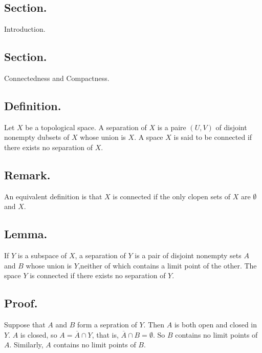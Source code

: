 \documentclass[titlepage]{article}
\begin{document}
\maketitle

\tableofcontents

\newpage {}

\subsection{Section.} Introduction.

\newpage {}

\subsection{Section.} Connectedness and Compactness.

\subsection{Definition.} Let $X$ be a topological space. A separation of $X$ is a paire $(U, V)$ of disjoint nonempty dubsets of $X$ whose union is $X$. A space $X$ is said to be connected if there exists no separation of $X$.

\subsection{Remark.} An equivalent definition is that $X$ is connected if the only clopen sets of $X$ are $\emptyset$ and $X$.

\subsection{Lemma.} If $Y$ is a subspace of $X$, a separation of $Y$ is a pair of disjoint nonempty sets $A$ and $B$ whose union is $Y$,neither of which contains a limit point of the other. The space $Y$ is connected if there exists no separation of $Y$.

\subsection{Proof.} Suppose that $A$ and $B$ form a sepration of $Y$. Then $A$ is both open and closed in $Y$. $A$ is closed, so $A = \overline{A} \cap Y$, that is, $\overline{A} \cap B = \emptyset$. So $B$ contains no limit points of $A$. Similarly, $A$ contains no limit points of $B$.
\end{document}
